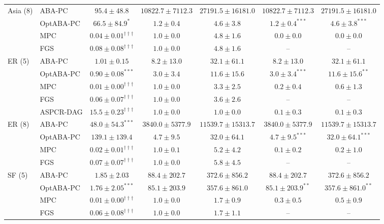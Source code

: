 \begin{table}[t]
{\begin{tabular}{llccccc}
\midrule
Asia (8) & ABA-PC & $95.4\pm48.8$ & $10822.7\pm7112.3$ & $27191.5\pm16181.0$ & $10822.7\pm7112.3$ & $27191.5\pm16181.0$\\
 & OptABA-PC & $\mathbf{66.5\pm84.9}^{*}$ & $1.2\pm0.4$ & $4.6\pm3.8$ & $\mathbf{1.2\pm0.4}^{***}$ & $\mathbf{4.6\pm3.8}^{***}$\\
 & MPC & $\mathbf{0.04\pm0.01}^{\dagger\dagger\dagger}$ & $1.0\pm0.0$ & $4.8\pm1.6$ & $0.0\pm0.0$ & $0.0\pm0.0$\\
 & FGS & $\mathbf{0.08\pm0.08}^{\dagger\dagger\dagger}$ & $1.0\pm0.0$ & $4.8\pm1.6$ & -- & --\\
\midrule
ER (5) & ABA-PC & $1.01\pm0.15$ & $8.2\pm13.0$ & $32.1\pm61.1$ & $8.2\pm13.0$ & $32.1\pm61.1$\\
 & OptABA-PC & $\mathbf{0.90\pm0.08}^{***}$ & $3.0\pm3.4$ & $11.6\pm15.6$ & $\mathbf{3.0\pm3.4}^{***}$ & $\mathbf{11.6\pm15.6}^{**}$\\
 & MPC & $\mathbf{0.01\pm0.00}^{\dagger\dagger\dagger}$ & $1.0\pm0.0$ & $3.3\pm2.5$ & $0.2\pm0.4$ & $0.6\pm1.3$\\
 & FGS & $\mathbf{0.06\pm0.07}^{\dagger\dagger\dagger}$ & $1.0\pm0.0$ & $3.6\pm2.6$ & -- & --\\
 & ASPCR-DAG & $15.5\pm0.23^{\dagger\dagger\dagger}$ & $1.0\pm0.0$ & $1.0\pm0.0$ & $0.1\pm0.3$ & $0.1\pm0.3$\\
\midrule
ER (8) & ABA-PC & $\mathbf{48.0\pm54.3}^{***}$ & $3840.0\pm5377.9$ & $11539.7\pm15313.7$ & $3840.0\pm5377.9$ & $11539.7\pm15313.7$\\
 & OptABA-PC & $139.1\pm139.4$ & $4.7\pm9.5$ & $32.0\pm64.1$ & $\mathbf{4.7\pm9.5}^{***}$ & $\mathbf{32.0\pm64.1}^{***}$\\
 & MPC & $\mathbf{0.02\pm0.01}^{\dagger\dagger\dagger}$ & $1.0\pm0.1$ & $5.2\pm4.2$ & $0.1\pm0.2$ & $0.2\pm1.0$\\
 & FGS & $\mathbf{0.07\pm0.07}^{\dagger\dagger\dagger}$ & $1.0\pm0.0$ & $5.8\pm4.5$ & -- & --\\
\midrule
SF (5) & ABA-PC & $1.85\pm2.03$ & $88.4\pm202.7$ & $372.6\pm856.2$ & $88.4\pm202.7$ & $372.6\pm856.2$\\
 & OptABA-PC & $\mathbf{1.76\pm2.05}^{***}$ & $85.1\pm203.9$ & $357.6\pm861.0$ & $\mathbf{85.1\pm203.9}^{**}$ & $\mathbf{357.6\pm861.0}^{**}$\\
 & MPC & $\mathbf{0.01\pm0.00}^{\dagger\dagger\dagger}$ & $1.0\pm0.0$ & $1.7\pm0.9$ & $0.3\pm0.5$ & $0.5\pm0.9$\\
 & FGS & $\mathbf{0.06\pm0.08}^{\dagger\dagger\dagger}$ & $1.0\pm0.0$ & $1.7\pm1.1$ & -- & --\\

\end{tabular}}
\end{table}
